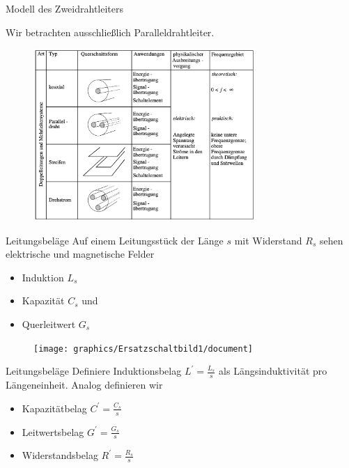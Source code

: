 \documentclass{beamer}
\begin{document}
\begin{frame}{Modell des Zweidrahtleiters}

Wir betrachten ausschließlich Paralleldrahtleiter.

\begin{figure}[!htb]
    \begin{center}
        \includegraphics[width=0.75\textwidth]{../Ausarbeitung/images/Leiter.png}
    \end{center}
\end{figure}

\end{frame}


\begin{frame}{Leitungsbeläge}
Auf einem Leitungsstück der Länge $s$ mit Widerstand $R_{s}$ sehen elektrische und magnetische Felder
\begin{itemize}
    \item<1-> Induktion $L_{s}$
    \item<2-> Kapazität $C_{s}$ und
    \item<3-> Querleitwert $G_{s}$
\end{itemize}
\begin{figure}[!htb]
    \begin{center}
        \texttt{[image: graphics/Ersatzschaltbild1/document]}
    \end{center}
\end{figure}
\end{frame}


\begin{frame}{Leitungsbeläge}
Definiere Induktionsbelag $L^{\prime} = \frac{L_{s}}{s}$ als Längsinduktivität pro Längeneinheit.
Analog definieren wir
\begin{itemize}
    \item Kapazitätbelag $C^{\prime} = \frac{C_{s}}{s}$
    \item Leitwertsbelag $G^{\prime} = \frac{G_{s}}{s}$
    \item Widerstandsbelag $R^{\prime} = \frac{R_{s}}{s}$
\end{itemize}

\end{frame}
\end{document}

